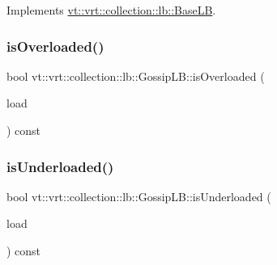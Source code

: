 Implements \hyperlink{structvt_1_1vrt_1_1collection_1_1lb_1_1_base_l_b_a555e29aadfd428383464d6dd007506b6}{vt\+::vrt\+::collection\+::lb\+::\+Base\+LB}.

\mbox{\label{structvt_1_1vrt_1_1collection_1_1lb_1_1_gossip_l_b_a8bbe18748b6dd4b5269e6abfed5c6f99}} 
\subsubsection{\texorpdfstring{is\+Overloaded()}{isOverloaded()}}
{\footnotesize\ttfamily bool vt\+::vrt\+::collection\+::lb\+::\+Gossip\+L\+B\+::is\+Overloaded (\begin{DoxyParamCaption}\item[{\hyperlink{structvt_1_1vrt_1_1collection_1_1lb_1_1_base_l_b_a215e22b9f12678303f49615ae3be05cc}{Load\+Type}}]{load }\end{DoxyParamCaption}) const\hspace{0.3cm}{\ttfamily [protected]}}

\mbox{\label{structvt_1_1vrt_1_1collection_1_1lb_1_1_gossip_l_b_a8714236643dcb620aa29956a6ff26b48}} 
\subsubsection{\texorpdfstring{is\+Underloaded()}{isUnderloaded()}}
{\footnotesize\ttfamily bool vt\+::vrt\+::collection\+::lb\+::\+Gossip\+L\+B\+::is\+Underloaded (\begin{DoxyParamCaption}\item[{\hyperlink{structvt_1_1vrt_1_1collection_1_1lb_1_1_base_l_b_a215e22b9f12678303f49615ae3be05cc}{Load\+Type}}]{load }\end{DoxyParamCaption}) const\hspace{0.3cm}{\ttfamily [protected]}}

